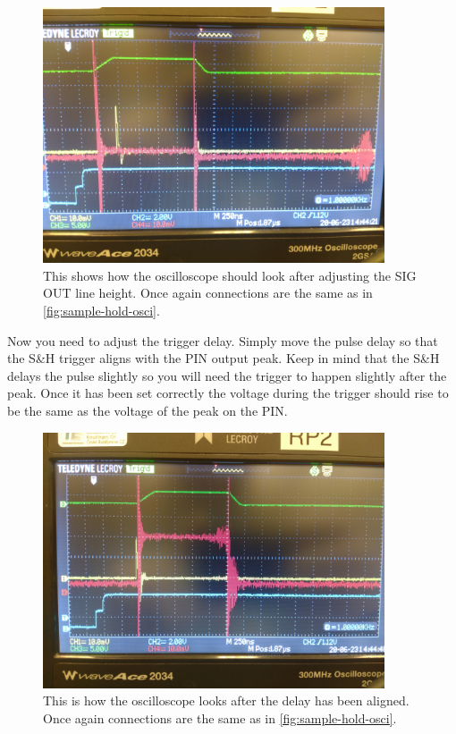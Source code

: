 \documentclass[a4paper, 10pt]{article}
\begin{document}
\begin{figure}[H]
    \centering
    \includegraphics[width=0.9\textwidth]{./images/config-height-adjust.jpg}
    \caption{This shows how the oscilloscope should look after adjusting the SIG OUT line height. Once again connections are the same as in \cref{fig:sample-hold-osci}.}
    \label{fig:config-height-adjust}
\end{figure}

Now you need to adjust the trigger delay.
Simply move the pulse delay so that the S\&H trigger aligns with the PIN output peak.
Keep in mind that the S\&H delays the pulse slightly so you will need the trigger to happen slightly after the peak.
Once it has been set correctly the voltage during the trigger should rise to be the same as the voltage of the peak on the PIN.

\begin{figure}[H]
    \centering
    \includegraphics[width=0.9\textwidth]{./images/config-delay-aligned.jpg}
    \caption{This is how the oscilloscope looks after the delay has been aligned. Once again connections are the same as in \cref{fig:sample-hold-osci}.}
    \label{fig:config-delay-aligned}
\end{figure}
\end{document}
